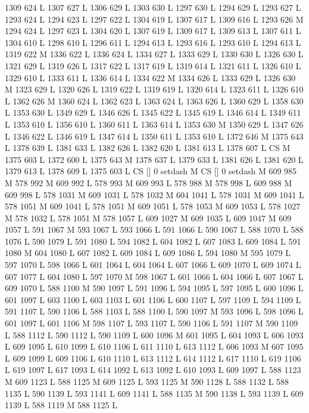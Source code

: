{{{{{{{{{{{{{{{{{{{{{{{{{{{1309 624 L
1307 627 L
1306 629 L
1303 630 L
1297 630 L
1294 629 L
1293 627 L
1293 624 L
1294 623 L
1297 622 L
1304 619 L
1307 617 L
1309 616 L
1293 626 M 1294 624 L
1297 623 L
1304 620 L
1307 619 L
1309 617 L
1309 613 L
1307 611 L
1304 610 L
1298 610 L
1296 611 L
1294 613 L
1293 616 L
1293 610 L
1294 613 L
1319 622 M 1336 622 L
1336 624 L
1334 627 L
1333 629 L
1330 630 L
1326 630 L
1321 629 L
1319 626 L
1317 622 L
1317 619 L
1319 614 L
1321 611 L
1326 610 L
1329 610 L
1333 611 L
1336 614 L
1334 622 M 1334 626 L
1333 629 L
1326 630 M 1323 629 L
1320 626 L
1319 622 L
1319 619 L
1320 614 L
1323 611 L
1326 610 L
1362 626 M 1360 624 L
1362 623 L
1363 624 L
1363 626 L
1360 629 L
1358 630 L
1353 630 L
1349 629 L
1346 626 L
1345 622 L
1345 619 L
1346 614 L
1349 611 L
1353 610 L
1356 610 L
1360 611 L
1363 614 L
1353 630 M 1350 629 L
1347 626 L
1346 622 L
1346 619 L
1347 614 L
1350 611 L
1353 610 L
1372 646 M 1375 643 L
1378 639 L
1381 633 L
1382 626 L
1382 620 L
1381 613 L
1378 607 L
CS M
1375 603 L
1372 600 L
1375 643 M 1378 637 L
1379 633 L
1381 626 L
1381 620 L
1379 613 L
1378 609 L
1375 603 L
CS [] 0 setdash M
CS [] 0 setdash M
609 985 M 578 992 M 609 992 L
578 993 M 609 993 L
578 988 M 578 998 L
609 988 M 609 998 L
578 1031 M 609 1031 L
578 1032 M 604 1041 L
578 1031 M 609 1041 L
578 1051 M 609 1041 L
578 1051 M 609 1051 L
578 1053 M 609 1053 L
578 1027 M 578 1032 L
578 1051 M 578 1057 L
609 1027 M 609 1035 L
609 1047 M 609 1057 L
591 1067 M 593 1067 L
593 1066 L
591 1066 L
590 1067 L
588 1070 L
588 1076 L
590 1079 L
591 1080 L
594 1082 L
604 1082 L
607 1083 L
609 1084 L
591 1080 M 604 1080 L
607 1082 L
609 1084 L
609 1086 L
594 1080 M 595 1079 L
597 1070 L
598 1066 L
601 1064 L
604 1064 L
607 1066 L
609 1070 L
609 1074 L
607 1077 L
604 1080 L
597 1070 M 598 1067 L
601 1066 L
604 1066 L
607 1067 L
609 1070 L
588 1100 M 590 1097 L
591 1096 L
594 1095 L
597 1095 L
600 1096 L
601 1097 L
603 1100 L
603 1103 L
601 1106 L
600 1107 L
597 1109 L
594 1109 L
591 1107 L
590 1106 L
588 1103 L
588 1100 L
590 1097 M 593 1096 L
598 1096 L
601 1097 L
601 1106 M 598 1107 L
593 1107 L
590 1106 L
591 1107 M 590 1109 L
588 1112 L
590 1112 L
590 1109 L
600 1096 M 601 1095 L
604 1093 L
606 1093 L
609 1095 L
610 1099 L
610 1106 L
611 1110 L
613 1112 L
606 1093 M 607 1095 L
609 1099 L
609 1106 L
610 1110 L
613 1112 L
614 1112 L
617 1110 L
619 1106 L
619 1097 L
617 1093 L
614 1092 L
613 1092 L
610 1093 L
609 1097 L
588 1123 M 609 1123 L
588 1125 M 609 1125 L
593 1125 M 590 1128 L
588 1132 L
588 1135 L
590 1139 L
593 1141 L
609 1141 L
588 1135 M 590 1138 L
593 1139 L
609 1139 L
588 1119 M 588 1125 L
}}}}}}}}}}}}}}}}}}}}}}}}}}}
